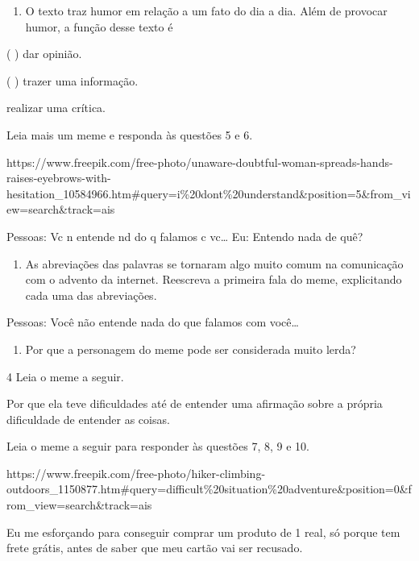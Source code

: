 \begin{itemize}
\begin{itemize}
{\begin{itemize}
\begin{itemize}
\begin{enumerate}
\def\labelenumi{\arabic{enumi}.}
\setcounter{enumi}{3}
\tightlist
\item
  O texto traz humor em relação a um fato do dia a dia. Além de provocar
  humor, a função desse texto é
\end{enumerate}

( ) dar opinião.

( ) trazer uma informação.

 realizar uma crítica.

Leia mais um meme e responda às questões 5 e 6.

https://www.freepik.com/free-photo/unaware-doubtful-woman-spreads-hands-raises-eyebrows-with-hesitation\_10584966.htm\#query=i\%20dont\%20understand\&position=5\&from\_view=search\&track=ais

Pessoas: Vc n entende nd do q falamos c vc\ldots{} Eu: Entendo nada de
quê?

\begin{enumerate}
\def\labelenumi{\arabic{enumi}.}
\setcounter{enumi}{4}
\tightlist
\item
  As abreviações das palavras se tornaram algo muito comum na
  comunicação com o advento da internet. Reescreva a primeira fala do
  meme, explicitando cada uma das abreviações.
\end{enumerate}


Pessoas: Você não entende nada do que falamos com você\ldots{}

\begin{enumerate}
\def\labelenumi{\arabic{enumi}.}
\setcounter{enumi}{5}
\tightlist
\item
  Por que a personagem do meme pode ser considerada muito lerda?
\end{enumerate}

\num{4} Leia o meme a seguir.


Por que ela teve dificuldades até de entender uma afirmação sobre a
própria dificuldade de entender as coisas.

Leia o meme a seguir para responder às questões 7, 8, 9 e 10.

https://www.freepik.com/free-photo/hiker-climbing-outdoors\_1150877.htm\#query=difficult\%20situation\%20adventure\&position=0\&from\_view=search\&track=ais

Eu me esforçando para conseguir comprar um produto de 1 real, só porque
tem frete grátis, antes de saber que meu cartão vai ser recusado.


\end{itemize}
\end{itemize}}
\end{itemize}
\end{itemize}
